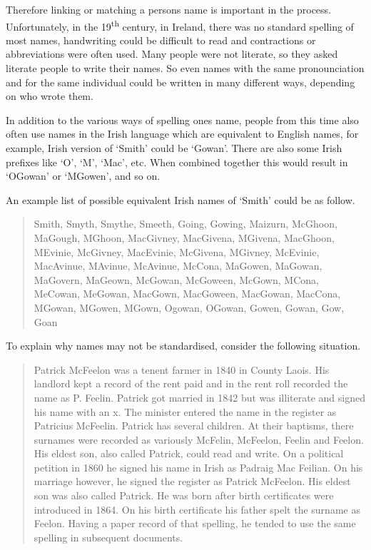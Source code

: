 Therefore linking or matching a person\textquotesingle s name is important in the process.
Unfortunately, in the 19\textsuperscript{th} century, in Ireland, there was no standard
spelling of most names, handwriting could be difficult to read
and contractions or abbreviations were often used. Many people were not literate,
so they asked literate people to write their names.
So even names with the same pronounciation and for the same individual
could be written in many different ways, depending on who wrote them.

In addition to the various ways of spelling one\textquotesingle s name,
people from this time also often use names in the Irish language
which are equivalent to English names,
for example, Irish version of `Smith' could be `Gowan'.
There are also some Irish prefixes like `O\textquotesingle', `M\textquotesingle', `Mac',
etc. When combined together this would result in `O\textquotesingle Gowan' or
`M\textquotesingle Gowen', and so on.

An example list of possible equivalent Irish names of `Smith'
could be as follow.

\begin{quotation} \noindent
Smith, Smyth, Smythe, Smeeth, Going, Gowing, Maizurn, McGhoon, MaGough,
M\textquotesingle Ghoon, MacGivney, MacGivena, M\textquotesingle Givena,
MacGhoon, M\textquotesingle Evinie, McGivney, MacEvinie, McGivena,
M\textquotesingle Givney, McEvinie, MacAvinue, M\textquotesingle Avinue,
McAvinue, McCona, MaGowen, MaGowan, MaGovern, MaGeown, McGowan, McGoween,
McGown, M\textquotesingle Cona, MeCowan, MeGowan, MacGown, MacGoween,
MacGowan, MacCona, M\textquotesingle Gowan, M\textquotesingle Gowen,
M\textquotesingle Gown, Ogowan, O\textquotesingle Gowan, Gowen,
Gowan, Gow, Goan
\end{quotation}

To explain why names may not be standardised, consider the following
situation.

\begin{quotation} \noindent
Patrick McFeelon was a tenent farmer in 1840 in County Laois.
His landlord kept a record of the rent paid and in the rent roll recorded
the name as P. Feelin. Patrick got married in 1842 but was illiterate
and signed his name with an x. The minister entered the name in the register
as Patricius McFeelin. Patrick has several children. At their baptisms,
there surnames were recorded as variously McFelin, McFeelon,
Feelin and Feelon. His eldest son, also called Patrick, could read and write.
On a political petition in 1860 he signed his name in Irish as
Padraig Mac Feilian. On his marriage however, he signed the register
as Patrick McFeelon. His eldest son was also called Patrick.
He was born after birth certificates were introduced in 1864.
On his birth certificate his father spelt the surname as Feelon.
Having a paper record of that spelling, he tended to use the same
spelling in subsequent documents.
\end{quotation}

